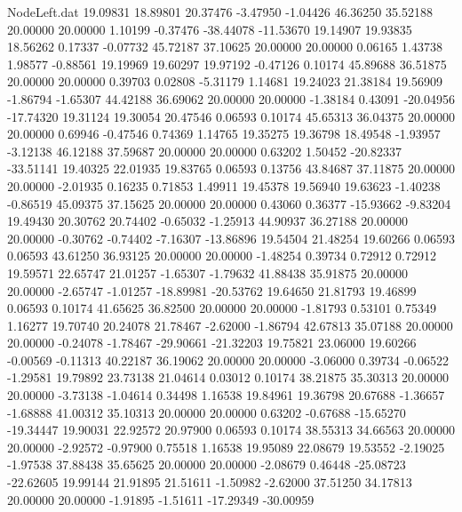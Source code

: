 \begin{filecontents}{NodeLeft.dat}
  19.09831   18.89801   20.37476    -3.47950   -1.04426   46.36250   35.52188   20.00000   20.00000    1.10199   -0.37476  -38.44078  -11.53670
  19.14907   19.93835   18.56262     0.17337   -0.07732   45.72187   37.10625   20.00000   20.00000    0.06165    1.43738    1.98577   -0.88561
  19.19969   19.60297   19.97192    -0.47126    0.10174   45.89688   36.51875   20.00000   20.00000    0.39703    0.02808   -5.31179    1.14681
  19.24023   21.38184   19.56909    -1.86794   -1.65307   44.42188   36.69062   20.00000   20.00000   -1.38184    0.43091  -20.04956  -17.74320
  19.31124   19.30054   20.47546     0.06593    0.10174   45.65313   36.04375   20.00000   20.00000    0.69946   -0.47546    0.74369    1.14765
  19.35275   19.36798   18.49548    -1.93957   -3.12138   46.12188   37.59687   20.00000   20.00000    0.63202    1.50452  -20.82337  -33.51141
  19.40325   22.01935   19.83765     0.06593    0.13756   43.84687   37.11875   20.00000   20.00000   -2.01935    0.16235    0.71853    1.49911
  19.45378   19.56940   19.63623    -1.40238   -0.86519   45.09375   37.15625   20.00000   20.00000    0.43060    0.36377  -15.93662   -9.83204
  19.49430   20.30762   20.74402    -0.65032   -1.25913   44.90937   36.27188   20.00000   20.00000   -0.30762   -0.74402   -7.16307  -13.86896
  19.54504   21.48254   19.60266     0.06593    0.06593   43.61250   36.93125   20.00000   20.00000   -1.48254    0.39734    0.72912    0.72912
  19.59571   22.65747   21.01257    -1.65307   -1.79632   41.88438   35.91875   20.00000   20.00000   -2.65747   -1.01257  -18.89981  -20.53762
  19.64650   21.81793   19.46899     0.06593    0.10174   41.65625   36.82500   20.00000   20.00000   -1.81793    0.53101    0.75349    1.16277
  19.70740   20.24078   21.78467    -2.62000   -1.86794   42.67813   35.07188   20.00000   20.00000   -0.24078   -1.78467  -29.90661  -21.32203
  19.75821   23.06000   19.60266    -0.00569   -0.11313   40.22187   36.19062   20.00000   20.00000   -3.06000    0.39734   -0.06522   -1.29581
  19.79892   23.73138   21.04614     0.03012    0.10174   38.21875   35.30313   20.00000   20.00000   -3.73138   -1.04614    0.34498    1.16538
  19.84961   19.36798   20.67688    -1.36657   -1.68888   41.00312   35.10313   20.00000   20.00000    0.63202   -0.67688  -15.65270  -19.34447
  19.90031   22.92572   20.97900     0.06593    0.10174   38.55313   34.66563   20.00000   20.00000   -2.92572   -0.97900    0.75518    1.16538
  19.95089   22.08679   19.53552    -2.19025   -1.97538   37.88438   35.65625   20.00000   20.00000   -2.08679    0.46448  -25.08723  -22.62605
  19.99144   21.91895   21.51611    -1.50982   -2.62000   37.51250   34.17813   20.00000   20.00000   -1.91895   -1.51611  -17.29349  -30.00959

\end{filecontents}
